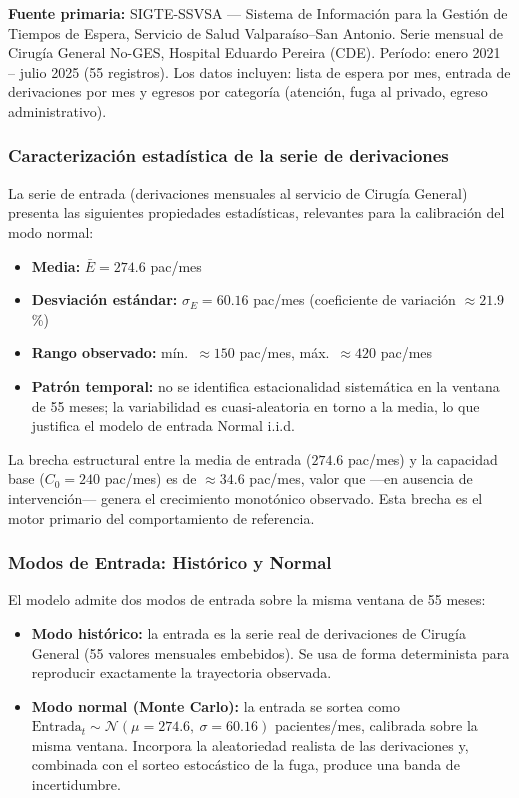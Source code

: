 \documentclass[12pt,a4paper]{article}
\begin{document}
\begin{databox}
  \textbf{Fuente primaria:} SIGTE-SSVSA — Sistema de Información para la Gestión de Tiempos de Espera, Servicio de Salud Valparaíso--San Antonio. Serie mensual de Cirugía General No-GES, Hospital Eduardo Pereira (CDE). Período: enero 2021 -- julio 2025 (55 registros). Los datos incluyen: lista de espera por mes, entrada de derivaciones por mes y egresos por categoría (atención, fuga al privado, egreso administrativo).
\end{databox}

\subsubsection*{Caracterización estadística de la serie de derivaciones}

La serie de entrada (derivaciones mensuales al servicio de Cirugía General) presenta las siguientes propiedades estadísticas, relevantes para la calibración del modo normal:

\begin{itemize}[leftmargin=1.5cm]
  \item \textbf{Media:} $\bar{E} = 274.6$ pac/mes
  \item \textbf{Desviación estándar:} $\sigma_E = 60.16$ pac/mes (coeficiente de variación $\approx 21.9$\,\%)
  \item \textbf{Rango observado:} mín.\ $\approx 150$ pac/mes, máx.\ $\approx 420$ pac/mes
  \item \textbf{Patrón temporal:} no se identifica estacionalidad sistemática en la ventana de 55 meses; la variabilidad es cuasi-aleatoria en torno a la media, lo que justifica el modelo de entrada Normal i.i.d.
\end{itemize}

La brecha estructural entre la media de entrada ($274.6$ pac/mes) y la capacidad base ($C_0 = 240$ pac/mes) es de $\approx 34.6$ pac/mes, valor que ---en ausencia de intervención--- genera el crecimiento monotónico observado. Esta brecha es el motor primario del comportamiento de referencia.

\subsubsection*{Modos de Entrada: Histórico y Normal}

El modelo admite dos modos de entrada sobre la misma ventana de 55 meses:

\begin{itemize}[leftmargin=1.5cm]
  \item \textbf{Modo histórico:} la entrada es la serie real de derivaciones de Cirugía General (55 valores mensuales embebidos). Se usa de forma determinista para reproducir exactamente la trayectoria observada.
  \item \textbf{Modo normal (Monte Carlo):} la entrada se sortea como $\text{Entrada}_t \sim \mathcal{N}(\mu=274.6,\ \sigma=60.16)$ pacientes/mes, calibrada sobre la misma ventana. Incorpora la aleatoriedad realista de las derivaciones y, combinada con el sorteo estocástico de la fuga, produce una banda de incertidumbre.
\end{itemize}
\end{document}

